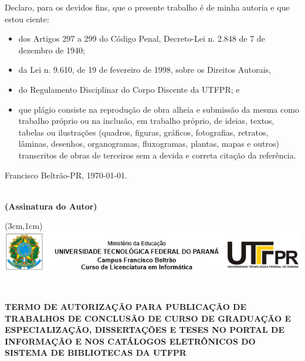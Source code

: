 \documentclass[12pt]{article}
\begin{document}
Declaro, para os devidos fins, que o presente trabalho é de minha autoria e que estou ciente:
\begin{itemize}\setlength\itemsep{.02em}
\item  dos Artigos 297 a 299 do Código Penal, Decreto-Lei n. 2.848 de 7 de dezembro de 1940;
\item  da Lei n. 9.610, de 19 de fevereiro de 1998, sobre os Direitos Autorais,
\item  do Regulamento Disciplinar do Corpo Discente da UTFPR; e
\item  que plágio consiste na reprodução de obra alheia e submissão da mesma como trabalho próprio ou na inclusão, em trabalho próprio, de ideias, textos, tabelas ou ilustrações (quadros, figuras, gráficos, fotografias, retratos, lâminas, desenhos, organogramas, fluxogramas, plantas, mapas e outros) transcritos de obras de terceiros sem a devida e correta citação da referência.
\end{itemize}

\vspace{\fill}

\hspace{\fill} Francisco Beltrão-PR, \today.

\vspace{4em}

\begin{center}
\linespread{1} \small 
\textbf{\discente\\(Assinatura do Autor)}
\end{center}

\pagebreak 

\thispagestyle{empty} 

\begin{center}
    \begin{textblock*}{\linewidth}(3cm,1cm)%
    \centering
     \includegraphics[width=\linewidth]{debib/logo.png}
    \end{textblock*} ~\\[1em]
\end{center}

\begin{center}
\begin{large}
\textbf{\small TERMO DE AUTORIZAÇÃO PARA PUBLICAÇÃO DE TRABALHOS DE CONCLUSÃO DE CURSO DE GRADUAÇÃO E ESPECIALIZAÇÃO, DISSERTAÇÕES E TESES NO PORTAL DE INFORMAÇÃO E NOS CATÁLOGOS ELETRÔNICOS DO SISTEMA DE BIBLIOTECAS DA UTFPR}
\end{large}
\end{center}
\end{document}
